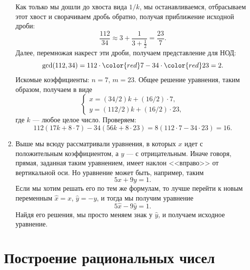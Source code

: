 \begin{enumerate}
Как только мы дошли до хвоста вида $1/k$, мы останавливаемся, отбрасываем этот хвост и сворачиваем дробь обратно, получая приближение исходной дроби:
$$
\frac{112}{34} \approx 3 + \frac{1}{3 + \frac{1}{2}} = \frac{23}{7}.
$$
Далее, перемножая накрест эти дроби, получаем представление для НОД:
$$
\gcd(112,34) = 112\cdot {\color{red}7} - 34\cdot {\color{red}23} = 2.
$$
Искомые коэффициенты: $n=7$, $m=23$. Общее решение уравнения, таким образом, получаем в виде
$$
\begin{cases}
x  = (34/2)k +  (16/2)\cdot 7, \\
y  = (112/2)k + (16/2)\cdot 23 ,
\end{cases}
$$
где $k$ --- любое целое число. Проверяем:
$$
112(17k +  8\cdot 7)-34(56k + 8\cdot 23) = 8(112\cdot 7- 34\cdot 23) = 16.
$$
\item Выше мы всюду рассматривали уравнения, в которых $x$ идет с положительным коэффициентом, а $y$ --- с отрицательным. Иначе говоря, прямая, заданная таким уравнением, имеет наклон <<вправо>> от вертикальной оси. Но уравнение может быть, например, таким
$$
5x+9y=1.
$$
Если мы хотим решать его по тем же формулам, то лучше перейти к новым переменным $\hat x=x$, $\hat y=-y$, и тогда мы получим уравнение
$$
5\hat x-9\hat y=1.
$$
Найдя его решения, мы просто меняем знак у $\hat y$, и получаем исходное уравнение.
\end{enumerate}

\label{Fields}



\section{Построение рациональных чисел}


